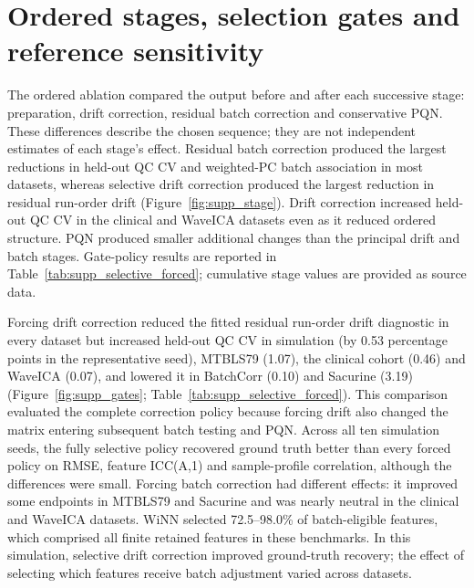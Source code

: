 \documentclass[namedate,webpdf,modern,large,nocrop]{oup-authoring-template}
\begin{document}
\begingroup
\renewcommand{\arraystretch}{0.90}

\endgroup

\section{Ordered stages, selection gates and reference sensitivity}
\label{sec:supp_ablation_results}

The ordered ablation compared the output before and after each successive stage: preparation, drift correction, residual batch correction and conservative PQN. These differences describe the chosen sequence; they are not independent estimates of each stage's effect. Residual batch correction produced the largest reductions in held-out QC CV and weighted-PC batch association in most datasets, whereas selective drift correction produced the largest reduction in residual run-order drift (Figure~\ref{fig:supp_stage}). Drift correction increased held-out QC CV in the clinical and WaveICA datasets even as it reduced ordered structure. PQN produced smaller additional changes than the principal drift and batch stages. Gate-policy results are reported in Table~\ref{tab:supp_selective_forced}; cumulative stage values are provided as source data.

Forcing drift correction reduced the fitted residual run-order drift diagnostic in every dataset but increased held-out QC CV in simulation (by 0.53 percentage points in the representative seed), MTBLS79 (1.07), the clinical cohort (0.46) and WaveICA (0.07), and lowered it in BatchCorr (0.10) and Sacurine (3.19) (Figure~\ref{fig:supp_gates}; Table~\ref{tab:supp_selective_forced}). This comparison evaluated the complete correction policy because forcing drift also changed the matrix entering subsequent batch testing and PQN. Across all ten simulation seeds, the fully selective policy recovered ground truth better than every forced policy on RMSE, feature ICC(A,1) and sample-profile correlation, although the differences were small. Forcing batch correction had different effects: it improved some endpoints in MTBLS79 and Sacurine and was nearly neutral in the clinical and WaveICA datasets. WiNN selected 72.5--98.0\% of batch-eligible features, which comprised all finite retained features in these benchmarks. In this simulation, selective drift correction improved ground-truth recovery; the effect of selecting which features receive batch adjustment varied across datasets.
\end{document}
